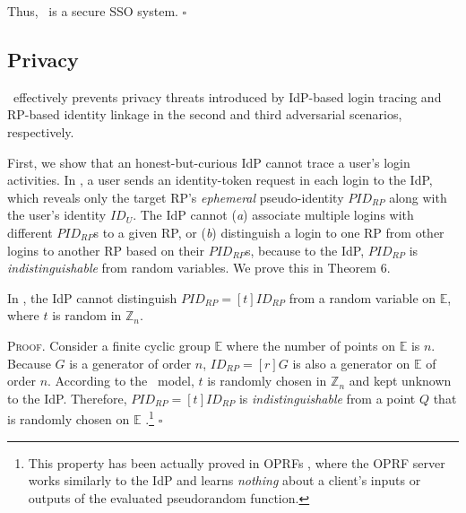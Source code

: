 Thus, \usso\ is a secure SSO system.
\hfill $\square$


\subsection{Privacy}
\label{sec-:analysis}
\usso\ effectively prevents privacy threats introduced by IdP-based login tracing and RP-based identity linkage in the second and third adversarial scenarios, respectively.

\newc
First, we show that an honest-but-curious IdP cannot trace a user's login activities. In \usso, a user sends an identity-token request in each login to the IdP, %
which reveals only the target RP's \emph{ephemeral} pseudo-identity $PID_{RP}$ along with the user's identity $ID_U$.
The IdP cannot (\emph{a}) associate multiple logins with different $PID_{RP}$s to a given RP,
 or (\emph{b}) distinguish a login to one RP from other logins to another RP based on their $PID_{RP}$s,
 because to the IdP, $PID_{RP}$ is \emph{indistinguishable} from random variables. We prove this in Theorem 6.

\vspace{2mm}
 { In \usso, the IdP cannot distinguish $PID_{RP} = [t]ID_{RP}$ from a random variable on $\mathbb{E}$, where $t$ is random in $\mathbb{Z}_n$.} %

\vspace{0.75mm}
\noindent \textsc{Proof.}
Consider a finite cyclic group $\mathbb{E}$ where the number of points on $\mathbb{E}$ is $n$.
Because $G$ is a generator of order $n$, $ID_{RP} = [r]G$ is also a generator on $\mathbb{E}$ of order $n$. According to the \dyu\ model, $t$ is randomly chosen in $\mathbb{Z}_n$ and kept unknown to the IdP. Therefore, $PID_{RP} = [t]ID_{RP}$ is \emph{indistinguishable} from a point $Q$ that is randomly chosen on $\mathbb{E}$ \cite{oprf-proved,strong-oprf,voprf-proved}.\footnote{This property has been actually proved in OPRFs \cite{oprf-proved,strong-oprf,voprf-proved}, where the OPRF server works similarly to the IdP and learns \emph{nothing} about a client's inputs or outputs of the evaluated pseudorandom function.} \hfill $\square$



